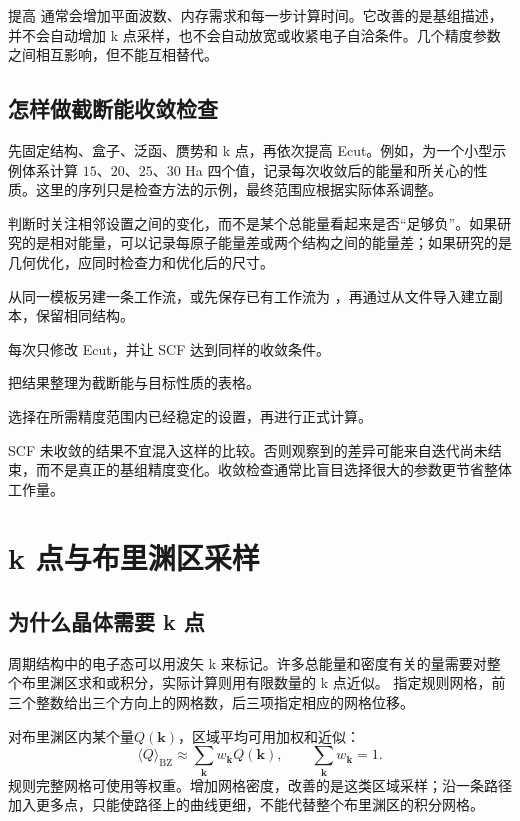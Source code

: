 提高  通常会增加平面波数、内存需求和每一步计算时间。它改善的是基组描述，并不会自动增加 k 点采样，也不会自动放宽或收紧电子自洽条件。几个精度参数之间相互影响，但不能互相替代。

\subsection{怎样做截断能收敛检查}

先固定结构、盒子、泛函、赝势和 k 点，再依次提高 Ecut。例如，为一个小型示例体系计算 $15$、$20$、$25$、$30$ Ha 四个值，记录每次收敛后的能量和所关心的性质。这里的序列只是检查方法的示例，最终范围应根据实际体系调整。

判断时关注相邻设置之间的变化，而不是某个总能量看起来是否“足够负”。如果研究的是相对能量，可以记录每原子能量差或两个结构之间的能量差；如果研究的是几何优化，应同时检查力和优化后的尺寸。

\begin{steps}
\item 从同一模板另建一条工作流，或先保存已有工作流为 ，再通过从文件导入建立副本，保留相同结构。
\item 每次只修改 Ecut，并让 SCF 达到同样的收敛条件。
\item 把结果整理为截断能与目标性质的表格。
\item 选择在所需精度范围内已经稳定的设置，再进行正式计算。
\end{steps}

SCF 未收敛的结果不宜混入这样的比较。否则观察到的差异可能来自迭代尚未结束，而不是真正的基组精度变化。收敛检查通常比盲目选择很大的参数更节省整体工作量。

\section{k 点与布里渊区采样}

\subsection{为什么晶体需要 k 点}

周期结构中的电子态可以用波矢 k 来标记。许多总能量和密度有关的量需要对整个布里渊区求和或积分，实际计算则用有限数量的 k 点近似。\mbox{} 指定规则网格，前三个整数给出三个方向上的网格数，后三项指定相应的网格位移。


对布里渊区内某个量$Q(\mathbf k)$，区域平均可用加权和近似：
\begin{equation}
  \langle Q\rangle_{\mathrm{BZ}}
      \approx\sum_{\mathbf k}w_{\mathbf k}Q(\mathbf k),
  \qquad \sum_{\mathbf k}w_{\mathbf k}=1.
  \label{eq:k-point-average}
\end{equation}
规则完整网格可使用等权重。增加网格密度，改善的是这类区域采样；沿一条路径加入更多点，只能使路径上的曲线更细，不能代替整个布里渊区的积分网格。

